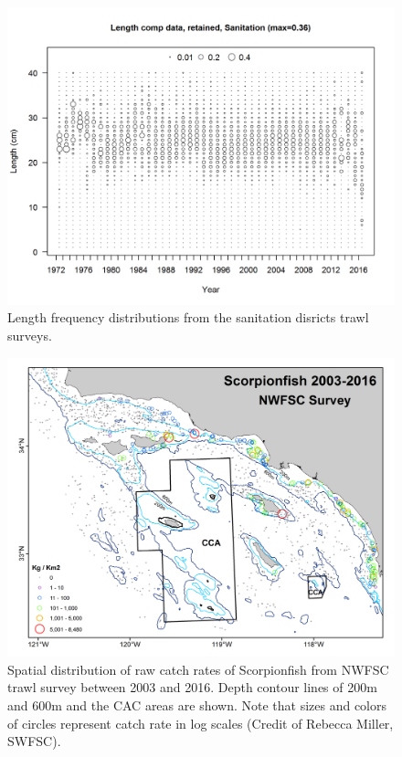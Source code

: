 \documentclass[12pt,]{article}
\begin{document}
\begin{figure}[htbp]
\centering
\includegraphics{r4ss/plots_mod1/comp_lendat_bubflt7mkt2_page2.png}
\caption{Length frequency distributions from the sanitation disricts
trawl surveys. \label{fig:Fleet7_comp_lendat_bubflt10mkt2}}
\end{figure}

\FloatBarrier

\begin{figure}[htbp]
\centering
\includegraphics{Figures/NWFSCtrawl_map.png}
\caption{Spatial distribution of raw catch rates of Scorpionfish from
NWFSC trawl survey between 2003 and 2016. Depth contour lines of 200m
and 600m and the CAC areas are shown. Note that sizes and colors of
circles represent catch rate in log scales (Credit of Rebecca Miller,
SWFSC). \label{fig:Fleet8_NWFSCtrawl_map}}
\end{figure}
\end{document}
